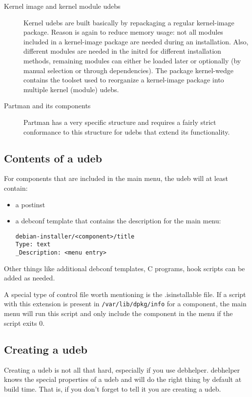 \documentclass[a4paper,10pt]{article}
\begin{document}
\begin{description}
\item[Kernel image and kernel module udebs]
Kernel udebs are built basically by repackaging a regular kernel-image package. Reason is again to reduce memory usage: not all modules included in a kernel-image package are needed during an installation. Also, different modules are needed in the initrd for different installation methods, remaining modules can either be loaded later or optionally (by manual selection or through dependencies). The package kernel-wedge contains the toolset used to reorganize a kernel-image package into multiple kernel (module) udebs. 
\item[Partman and its components]
Partman has a very specific structure and requires a fairly strict conformance to this structure for udebs that extend its functionality. 
\end{description}


\subsection{Contents of a udeb}
For components that are included in the main menu, the udeb will at least contain: 

\begin{itemize}
\item a postinst 
\item a debconf template that contains the description for the main menu:
  \begin{verbatim}
debian-installer/<component>/title
Type: text
_Description: <menu entry>
  \end{verbatim}
\end{itemize}

Other things like additional debconf templates, C programs, hook scripts can be added as needed. 

A special type of control file worth mentioning is the .isinstallable file. If a script with this extension is present in \texttt{/var/lib/dpkg/info} for a component, the main menu will run this script and only include the component in the menu if the script exits 0. 


\subsection{Creating a udeb}
Creating a udeb is not all that hard, especially if you use debhelper. debhelper knows the special properties of a udeb and will do the right thing by default at build time. That is, if you don't forget to tell it you are creating a udeb. 
\end{document}
